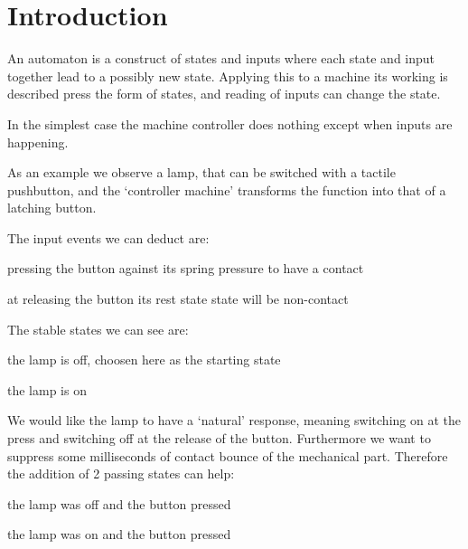 \documentclass[a4paper, 11pt, fleqn, twoside]{scrartcl}%
\renewenvironment{description}[1][1.5em]%
 {\list{}{\labelwidth=0pt \leftmargin=#1
  \let\makelabel\descriptionlabel}}
 {\endlist}
\begin{document}
\pagestyle{RvLpagina}

\section{Introduction}
An automaton is a construct of states and inputs where each state and input
 together lead to a possibly new state. Applying this to a machine its working
 is described press the form of states, and reading of inputs can change the
 state.

In the simplest case the machine controller does nothing except when inputs
 are happening.

As an example we observe a lamp, that can be switched with a tactile pushbutton,
 and the `controller machine' transforms the function into that of a latching
 button.

The input events we can deduct are:
\begin{description}
\item[press] pressing the button against its spring pressure to have a contact
\item[release] at releasing the button its rest state state will be non-contact
\end{description}

The stable states we can see are:
\begin{description}
\item[off] the lamp is off, choosen here as the starting state
\item[on] the lamp is on
\end{description}

We would like the lamp to have a `natural' response, meaning switching on at
 the press and switching off at the release of the button. Furthermore we
 want to suppress some milliseconds of contact bounce of the mechanical part.
 Therefore the addition of 2 passing states can help:

\begin{description}
\item[off1] the lamp was off and the button pressed
\item[on1] the lamp was on and the button pressed
\end{description}
\end{document}
